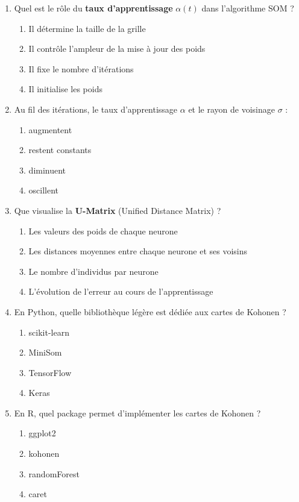 \documentclass[a4paper,11pt]{article}
\theoremstyle{definition}
\begin{document}
\begin{enumerate}
    \item Quel est le rôle du \textbf{taux d'apprentissage} $\alpha(t)$ dans l'algorithme SOM ?
    \begin{enumerate}
        \item Il détermine la taille de la grille
        \item Il contrôle l'ampleur de la mise à jour des poids
        \item Il fixe le nombre d'itérations
        \item Il initialise les poids
    \end{enumerate}

    \item Au fil des itérations, le taux d'apprentissage $\alpha$ et le rayon de voisinage $\sigma$ :
    \begin{enumerate}
        \item augmentent
        \item restent constants
        \item diminuent
        \item oscillent
    \end{enumerate}

    \item Que visualise la \textbf{U-Matrix} (Unified Distance Matrix) ?
    \begin{enumerate}
        \item Les valeurs des poids de chaque neurone
        \item Les distances moyennes entre chaque neurone et ses voisins
        \item Le nombre d'individus par neurone
        \item L'évolution de l'erreur au cours de l'apprentissage
    \end{enumerate}

    \item En Python, quelle bibliothèque légère est dédiée aux cartes de Kohonen ?
    \begin{enumerate}
        \item scikit-learn
        \item MiniSom
        \item TensorFlow
        \item Keras
    \end{enumerate}

    \item En R, quel package permet d'implémenter les cartes de Kohonen ?
    \begin{enumerate}
        \item ggplot2
        \item kohonen
        \item randomForest
        \item caret
    \end{enumerate}


\end{enumerate}
\end{document}
